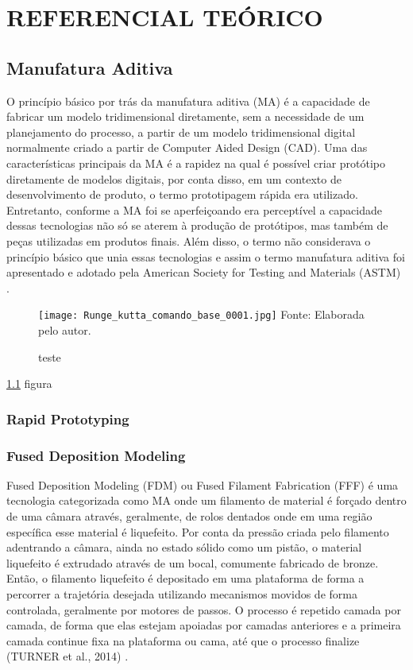 \chapter{REFERENCIAL TEÓRICO}

\section{Manufatura Aditiva}
O princípio básico por trás da manufatura aditiva (MA) é a 
capacidade de fabricar um modelo tridimensional diretamente, 
sem a necessidade de um planejamento do processo, a partir de 
um modelo tridimensional digital normalmente criado a partir 
de Computer Aided Design (CAD). Uma das características 
principais da MA é a rapidez na qual é possível criar protótipo
diretamente de modelos digitais, por conta disso, em um contexto 
de desenvolvimento de produto, o termo prototipagem rápida era 
utilizado. Entretanto, conforme a MA foi se aperfeiçoando era 
perceptível a capacidade dessas tecnologias não só se aterem à 
produção de protótipos, mas também de peças utilizadas em 
produtos finais. Além disso, o termo não considerava o princípio 
básico que unia essas tecnologias e assim o termo manufatura 
aditiva foi apresentado e adotado pela American Society for 
Testing and Materials (ASTM) \cite{gibson15}.

\begin{figure}[!htb]
    \centering
    \caption{teste}
    \texttt{[image: Runge\_kutta\_comando\_base\_0001.jpg]}
    {\footnotesize Fonte: Elaborada pelo autor.}
    \label{fig:label}
\end{figure}

\ref{fig:label} figura
\subsection{Rapid Prototyping}

\subsection{Fused Deposition Modeling}
Fused Deposition Modeling (FDM) ou Fused Filament Fabrication 
(FFF) é uma tecnologia categorizada como MA onde um filamento 
de material é forçado dentro de uma câmara através, geralmente,
de rolos dentados onde em uma região específica esse material 
é liquefeito. Por conta da pressão criada pelo filamento 
adentrando a câmara, ainda no estado sólido como um pistão, 
o material liquefeito é extrudado através de um bocal, 
comumente fabricado de bronze. Então, o filamento liquefeito é 
depositado em uma plataforma de forma a percorrer a trajetória 
desejada utilizando mecanismos movidos de forma controlada, 
geralmente por motores de passos. O processo é repetido camada 
por camada, de forma que elas estejam apoiadas por camadas 
anteriores e a primeira camada continue fixa na plataforma ou 
cama, até que o processo finalize (TURNER et al., 2014) \cite{turner14}.

